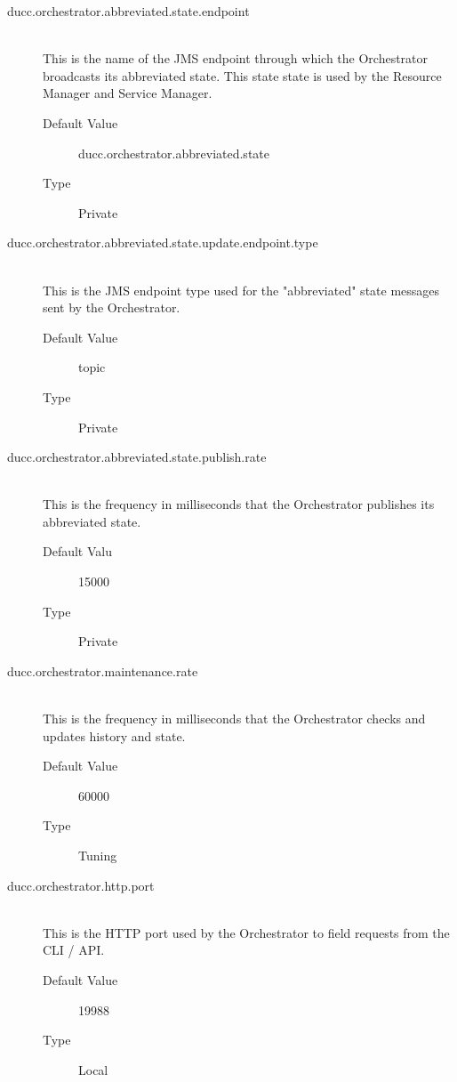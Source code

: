 \begin{description}
      \item[ducc.orchestrator.abbreviated.state.endpoint] \hfill \\
        This is the name of the JMS endpoint through which the Orchestrator broadcasts its 
        abbreviated state. This state state is used by the Resource Manager and Service Manager. 
        \begin{description}
          \item[Default Value] ducc.orchestrator.abbreviated.state 
          \item[Type] Private
        \end{description} 
        
      \item[ducc.orchestrator.abbreviated.state.update.endpoint.type] \hfill \\
        This is the JMS endpoint type used for the "abbreviated" state messages sent by the 
        Orchestrator. 
        \begin{description}
          \item[Default Value] topic 
          \item[Type] Private
        \end{description} 
        
      \item[ducc.orchestrator.abbreviated.state.publish.rate] \hfill \\
        This is the frequency in milliseconds that the Orchestrator publishes its abbreviated state. 
        \begin{description}
          \item[Default Valu] 15000 
          \item[Type] Private
        \end{description} 

      \item[ducc.orchestrator.maintenance.rate] \hfill \\
        This is the frequency in milliseconds that the Orchestrator checks and updates history and 
        state. 
        \begin{description}
          \item[Default Value] 60000 
          \item[Type] Tuning 
        \end{description}
        
      \item[ducc.orchestrator.http.port] \hfill \\
        This is the HTTP port used by the Orchestrator to field requests from the CLI / API. 
        \begin{description}          
          \item[Default Value] 19988
          \item[Type] Local 
        \end{description}
        

\end{description}
